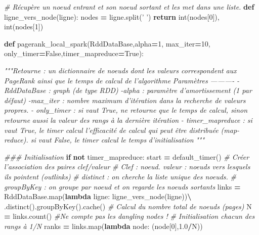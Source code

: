 \documentclass[10pt,a4paper]{article}
\newenvironment{Shaded}{\begin{snugshade}}{\end{snugshade}}
\newcommand{\BuiltInTok}[1]{#1}
\newcommand{\CommentTok}[1]{\textcolor[rgb]{0.56,0.35,0.01}{\textit{#1}}}
\newcommand{\ControlFlowTok}[1]{\textcolor[rgb]{0.13,0.29,0.53}{\textbf{#1}}}
\newcommand{\DecValTok}[1]{\textcolor[rgb]{0.00,0.00,0.81}{#1}}
\newcommand{\FloatTok}[1]{\textcolor[rgb]{0.00,0.00,0.81}{#1}}
\newcommand{\KeywordTok}[1]{\textcolor[rgb]{0.13,0.29,0.53}{\textbf{#1}}}
\newcommand{\NormalTok}[1]{#1}
\newcommand{\OperatorTok}[1]{\textcolor[rgb]{0.81,0.36,0.00}{\textbf{#1}}}
\newcommand{\StringTok}[1]{\textcolor[rgb]{0.31,0.60,0.02}{#1}}
\newcommand{\VariableTok}[1]{\textcolor[rgb]{0.00,0.00,0.00}{#1}}
\theoremstyle{break}
\begin{document}
\begin{Shaded}
\begin{Highlighting}[]
\CommentTok{# Récupère un noeud entrant et son noeud sortant et les met dans une liste. }
\KeywordTok{def}\NormalTok{ ligne_vers_node(ligne):}
\NormalTok{    nodes }\OperatorTok{=}\NormalTok{ ligne.split(}\StringTok{' '}\NormalTok{) }
    \ControlFlowTok{return} \BuiltInTok{int}\NormalTok{(nodes[}\DecValTok{0}\NormalTok{]), }\BuiltInTok{int}\NormalTok{(nodes[}\DecValTok{1}\NormalTok{])}

\KeywordTok{def}\NormalTok{ pagerank_local_spark(RddDataBase,alpha}\OperatorTok{=}\DecValTok{1}\NormalTok{, max_iter}\OperatorTok{=}\DecValTok{10}\NormalTok{,}
\NormalTok{                         only_timer}\OperatorTok{=}\VariableTok{False}\NormalTok{,timer_mapreduce}\OperatorTok{=}\VariableTok{True}\NormalTok{): }

    \CommentTok{"""Retourne : un dictionnaire de noeuds dont les valeurs correspondent}
\CommentTok{     aux PageRank ainsi que le temps de calcul de l'algorithme}
\CommentTok{      }
\CommentTok{    Paramètres}
\CommentTok{    ---------- }
\CommentTok{    -RddDataBase : graph (de type RDD) }
\CommentTok{    -alpha : paramètre d'amortissement (1 par défaut) }
\CommentTok{    -max_iter : nombre maximum d'itération dans la recherche de valeurs propres. }
\CommentTok{    - only_timer : si vaut True, ne retourne que le temps de calcul, sinon retourne }
\CommentTok{    aussi la valeur des rangs à la dernière itération }
\CommentTok{    - timer_mapreduce : si vaut True, le timer calcul l'efficacité de calcul qui peut}
\CommentTok{    être distribuée (map-reduce). si vaut False, le timer calcul le temps}
\CommentTok{    d'initialisation}
\CommentTok{    }
\CommentTok{    """}

    
    \CommentTok{### Initialisation}
    \ControlFlowTok{if} \KeywordTok{not}\NormalTok{ timer_mapreduce:}
\NormalTok{            start }\OperatorTok{=}\NormalTok{ default_timer()}
    \CommentTok{# Créer l'association des paires clef/valeur}
    \CommentTok{# Clef : noeud. valeur : noeuds vers lesquels ils pointent (outlinks)}
    \CommentTok{# distinct : on cherche la liste unique des noeuds.}
    \CommentTok{# groupByKey : on groupe par noeud et on regarde les noeuds sortants}
\NormalTok{    links }\OperatorTok{=}\NormalTok{ RddDataBase.}\BuiltInTok{map}\NormalTok{(}\KeywordTok{lambda}\NormalTok{ ligne: ligne_vers_node(ligne))}\OperatorTok{\textbackslash{}}
\NormalTok{    .distinct().groupByKey().cache()}
    \CommentTok{# Calcul du nombre total de noeuds (pages)}
\NormalTok{    N }\OperatorTok{=}\NormalTok{ links.count() }\CommentTok{#Ne compte pas les dangling nodes !}
    \CommentTok{# Initialisation chacun des rangs à 1/N}
\NormalTok{    ranks }\OperatorTok{=}\NormalTok{ links.}\BuiltInTok{map}\NormalTok{(}\KeywordTok{lambda}\NormalTok{ node: (node[}\DecValTok{0}\NormalTok{],}\FloatTok{1.0}\OperatorTok{/}\NormalTok{N))}
    

\end{Highlighting}
\end{Shaded}
\end{document}
